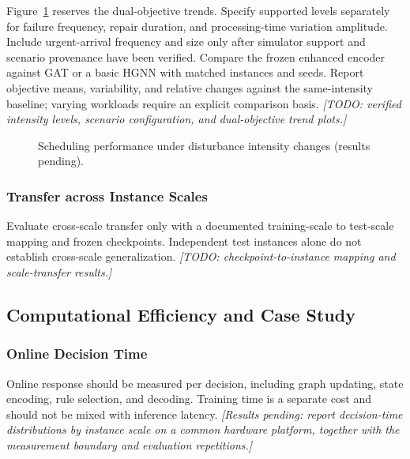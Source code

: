 Figure~\ref{fig:intensity_pending} reserves the dual-objective trends. Specify supported levels separately for failure frequency, repair duration, and processing-time
variation amplitude. Include urgent-arrival frequency and size only after simulator support and
scenario provenance have been verified. Compare the frozen enhanced encoder against GAT or a
basic HGNN with matched instances and seeds. Report objective means, variability, and relative
changes against the same-intensity baseline; varying workloads require an explicit comparison basis.
\textit{[TODO: verified intensity levels, scenario configuration, and dual-objective trend plots.]}


\begin{figure}[t]
\centering
{}
\caption{Scheduling performance under disturbance intensity changes (results pending).}
\label{fig:intensity_pending}
\end{figure}

\subsubsection{Transfer across Instance Scales}
Evaluate cross-scale transfer only with a documented training-scale to test-scale mapping and
frozen checkpoints. Independent test instances alone do not establish cross-scale generalization.
\textit{[TODO: checkpoint-to-instance mapping and scale-transfer results.]}

\subsection{Computational Efficiency and Case Study}
\label{subsec:efficiency_case}
\subsubsection{Online Decision Time}
Online response should be measured per decision, including graph updating, state encoding, rule selection,
and decoding. Training time is a separate cost and should not be mixed with inference latency.
\textit{[Results pending: report decision-time distributions by instance scale on a common hardware platform,
together with the measurement boundary and evaluation repetitions.]}

